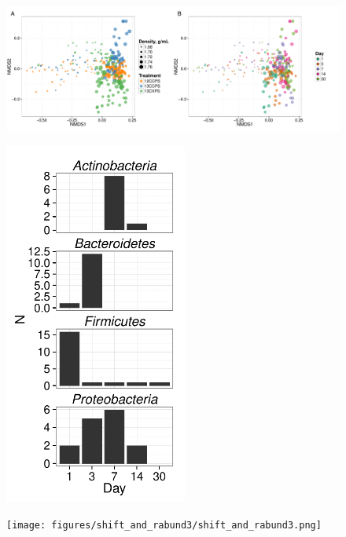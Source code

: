 \thispagestyle{empty}


\begin{figure}[H] \begin{center}
\centerline{\includegraphics[width=11.4cm]{figures/ordination_all1/ordination_all.pdf}}
\caption{\protect}\label{fig:ord}
\end{center} \end{figure}

\begin{figure}[H]
	\begin{center}
	\centerline{\includegraphics[width=6.0cm]{figures/xylose_rspndr_bar/xylose_rspndr_bar.pdf}}
	\caption{\protect}\label{fig:xyl_count}
        \end{center}
\end{figure}

\begin{figure}[H]
	\begin{center}
	\centerline{\texttt{[image: figures/shift\_and\_rabund3/shift\_and\_rabund3.png]}}
	\caption{\protect}\label{fig:shift}
    \end{center}
\end{figure}

